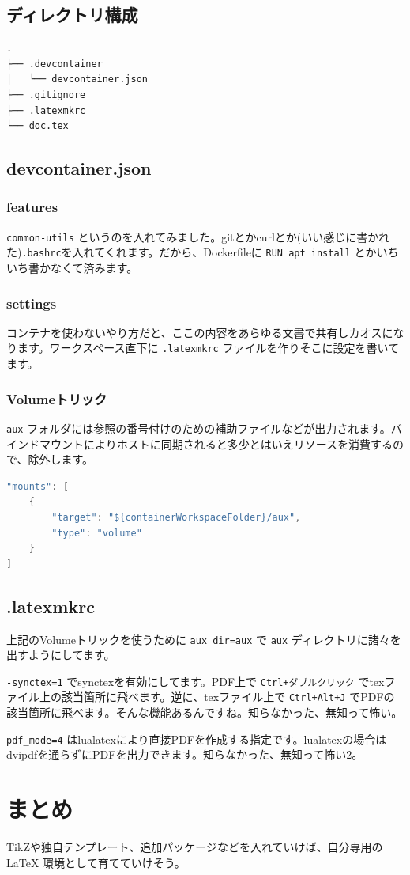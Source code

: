 \documentclass[lualatex,paper=a4paper]{jlreq}
\begin{document}
\subsection{ディレクトリ構成}
\begin{lstlisting}
.
├── .devcontainer
│   └── devcontainer.json
├── .gitignore
├── .latexmkrc
└── doc.tex
\end{lstlisting}

\subsection{devcontainer.json}

\subsubsection{features}
\texttt{common-utils} というのを入れてみました。gitとかcurlとか(いい感じに書かれた)\texttt{.bashrc}を入れてくれます。だから、Dockerfileに \texttt{RUN apt install} とかいちいち書かなくて済みます。

\subsubsection{settings}
コンテナを使わないやり方だと、ここの内容をあらゆる文書で共有しカオスになります。ワークスペース直下に \texttt{.latexmkrc} ファイルを作りそこに設定を書いてます。

\subsubsection{Volumeトリック}
\texttt{aux} フォルダには参照の番号付けのための補助ファイルなどが出力されます。バインドマウントによりホストに同期されると多少とはいえリソースを消費するので、除外します。

\begin{lstlisting}[language=C, caption=devcontainer.json での volume 設定]
"mounts": [
    {
        "target": "${containerWorkspaceFolder}/aux",
        "type": "volume"
    }
]
\end{lstlisting}

\subsection{.latexmkrc}
上記のVolumeトリックを使うために \texttt{aux\_dir=aux} で \texttt{aux} ディレクトリに諸々を出すようにしてます。

\texttt{-synctex=1} でsynctexを有効にしてます。PDF上で \texttt{Ctrl+ダブルクリック} でtexファイル上の該当箇所に飛べます。逆に、texファイル上で \texttt{Ctrl+Alt+J} でPDFの該当箇所に飛べます。そんな機能あるんですね。知らなかった、無知って怖い。

\texttt{pdf\_mode=4} はlualatexにより直接PDFを作成する指定です。lualatexの場合はdvipdfを通らずにPDFを出力できます。知らなかった、無知って怖い2。

\section{まとめ}
TikZや独自テンプレート、追加パッケージなどを入れていけば、自分専用の \LaTeX{} 環境として育てていけそう。
\end{document}
